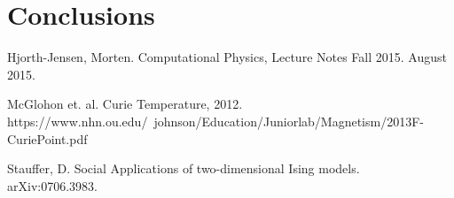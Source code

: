 \documentclass[%
oneside,                 %
final,                   %
10pt]{article}
\begin{document}
\section{Conclusions}


\begin{comment}

\begin{figure}[H]\label{fig:compzoom}
  \centering
    \texttt{[image: compzoom.eps]}
    \caption{A zoomed in view of the convergence to the exact solution}
\end{figure}

\begin{center} 
\begin{tabular}{ |c|c|c|c| }
\hline
Size of Matrix ($10^n$) & General & Tailored & LU \\
\hline
1& 3.00 E -6 & 3.00 E -6 & 2.40 E -5\\ 
2 & 4.00 E -6 & 4.00 E -6 & 1.71 E -3 \\ 
3 & 3.90 E -5 & 1.90 E -5 & 1.93\\ 
4 & 3.79 E -4 & 2.09 E -4 & N/A\\ 
5 & 3.38 E -3 & 1.51 E -3  & N/A\\ 
6 & 2.87 E -2 & 1.53 E -2 & N/A\\ 
7 & 3.16 E -1 & 1.73 E -1& N/A\\ 
\hline
\end{tabular}
\label{table:test}
\end{center}

\end{comment}

\begin{thebibliography}{9}

Hjorth-Jensen, Morten. 
Computational Physics, Lecture Notes Fall 2015. 
August 2015.

McGlohon et. al.
Curie Temperature, 2012.
https://www.nhn.ou.edu/~johnson/Education/Juniorlab/Magnetism/2013F-CuriePoint.pdf

Stauffer, D.
Social Applications of two-dimensional Ising models.
arXiv:0706.3983.

\end{thebibliography}



\end{document}

